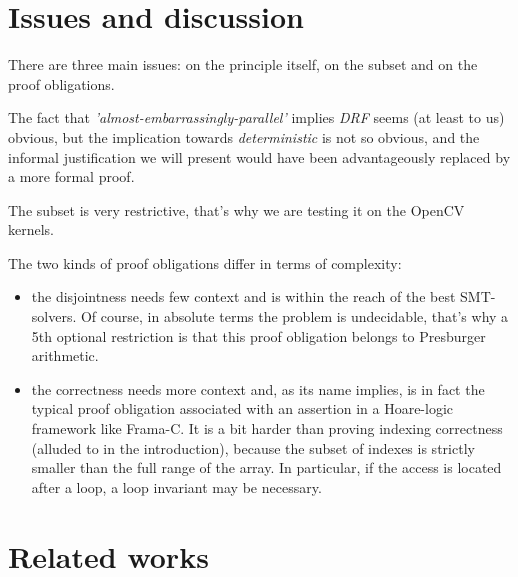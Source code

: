 \documentclass[a4paper,10pt]{article} %
\begin{document}
\section{Issues and discussion}

There are three main issues: on the principle itself, on the subset and on the proof obligations.

The fact that \emph{'almost-embarrassingly-parallel'} implies \emph{DRF} seems (at least to us) obvious, but the implication towards \emph{deterministic} is not so obvious,
and the informal justification we will present would have been advantageously replaced by a more formal proof. 

The subset is very restrictive, that's why we are testing it on the OpenCV kernels.

The two kinds of proof obligations differ in terms of complexity:
\begin{itemize}
\item the disjointness needs few context and is within the reach of the best SMT-solvers. Of course, in absolute terms the problem is undecidable, that's why a 5th optional restriction is that this proof obligation belongs to Presburger arithmetic.
\item the correctness needs more context and, as its name implies, is in fact the typical proof obligation associated with an assertion in a Hoare-logic framework like Frama-C.
It is a bit harder than proving indexing correctness (alluded to in the introduction), because the subset of indexes is strictly smaller than the full range of the array.
In particular, if the access is located after a loop, a loop invariant may be necessary.
\end{itemize}

\begin{comment}

bla

skeletons : \cite{cole2004bringing}, \cite{steuwer2011skelc}

\cite{betts2012gpuverify}

Early GPUs were primarily tailored toward \emph{embarrassingly parallel} graphics workloads :
computing independently each of the pixels that constitute the display, hence a low degree of data sharing.

\end{comment}

\section{Related works}
\end{document}
